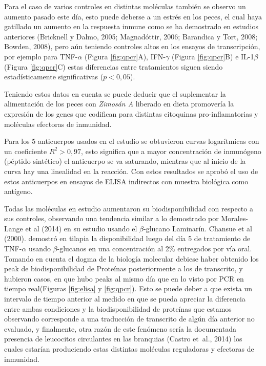 \documentclass[12pt,letterpaper,oneside]{scrbook}
\begin{document}
Para el caso de varios controles en distintas moléculas también se
observo un aumento pasado este día, esto puede deberse a un estrés en
los peces, el cual haya gatillado un aumento en la respuesta inmune como
se ha demostrado en estudios anteriores (Bricknell y Dalmo, 2005;
Magnadóttir, 2006; Barandica y Tort, 2008; Bowden, 2008), pero aún
teniendo controles altos en los ensayos de transcripción, por ejemplo
para TNF-\(\alpha\) (Figura \ref{fig:qpcr}A), IFN-\(\gamma\) (Figura
\ref{fig:qpcr}B) e IL-1\(\beta\) (Figura \ref{fig:qpcr}C) estas
diferencias entre tratamientos siguen siendo estadísticamente
significativas (\(p < 0,05\)).

Teniendo estos datos en cuenta se puede deducir que el suplementar la
alimentación de los peces con \emph{Zimosán A} liberado en dieta
promovería la expresión de los genes que codifican para distintas
citoquinas pro-inflamatorias y moléculas efectoras de inmunidad.

Para los 5 anticuerpos usados en el estudio se obtuvieron curvas
logarítmicas con un coeficiente \(R^2 > 0,97\), esto significa que a
mayor concentración de inmunógeno (péptido sintético) el anticuerpo se
va saturando, mientras que al inicio de la curva hay una linealidad en
la reacción. Con estos resultados se aprobó el uso de estos anticuerpos
en ensayos de ELISA indirectos con muestra biológica como antígeno.

Todas las moléculas en estudio aumentaron su biodisponibilidad con
respecto a sus controles, observando una tendencia similar a lo
demostrado por Morales-Lange et al (2014) en su estudio usando el
\(\beta\)-glucano Laminarín. Chansue et al (2000). demostró en tilapia
la disponibilidad luego del día 5 de tratamiento de TNF-\(\alpha\)
usando \(\beta\)-glucanos en una concentración al 2\% entregados por vía
oral. Tomando en cuenta el dogma de la biología molecular debiese haber
obtenido los peak de biodisponibilidad de Proteínas posteriormente a los
de transcrito, y hubieron casos, en que hubo peaks al mismo día que en
lo visto por PCR en tiempo real(Figuras \ref{fig:elisa} y
\ref{fig:qpcr}). Esto se puede deber a que exista un intervalo de tiempo
anterior al medido en que se pueda apreciar la diferencia entre ambas
condiciones y la biodisponibilidad de proteínas que estamos observando
corresponde a una traducción de transcrito de algún día anterior no
evaluado, y finalmente, otra razón de este fenómeno sería la documentada
presencia de leucocitos circulantes en las branquias (Castro et~al.,
2014) los cuales estarían produciendo estas distintas moléculas
reguladoras y efectoras de inmunidad.
\end{document}
